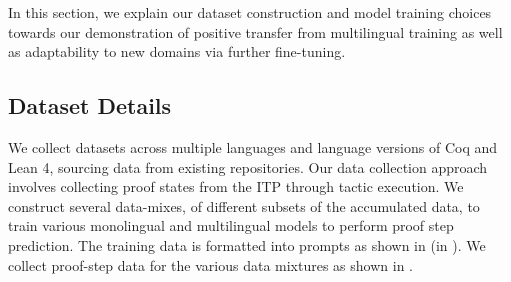 \newcommand{\CompCertUrl}[0]{\href{https://github.com/AbsInt/CompCert}{https://github.com/AbsInt/CompCert}}
\newcommand{\MathCompUrl}[0]{\href{https://github.com/math-comp/math-comp}{https://github.com/math-comp/math-comp}}
\newcommand{\GeoCoqUrl}[0]{\href{https://github.com/GeoCoq/GeoCoq}{https://github.com/GeoCoq/GeoCoq}}
\newcommand{\CategoryTheoryUrl}[0]{\href{https://github.com/jwiegley/category-theory}{https://github.com/jwiegley/category-theory}}
\newcommand{\LeanUrl}[0]{\href{https://github.com/leanprover-community/mathlib4}{https://github.com/leanprover-community/mathlib4}}
\newcommand{\CodeTFiveModelSize}[0]{\texttt{60 M}}
\newcommand{\CatTheory}[0]{\textsc{Cat-Theory}}

In this section, we explain our dataset construction and model training choices towards our demonstration of positive transfer from multilingual training as well as adaptability to new domains via further fine-tuning.

\subsection{Dataset Details}
We collect datasets across multiple languages and language versions of Coq and Lean 4, sourcing data from existing repositories. Our data collection approach involves collecting proof states from the ITP through tactic execution. We construct several data-mixes, of different subsets of the accumulated data, to train various monolingual and multilingual \proofwala{} models to perform proof step prediction. The training data is formatted into prompts as shown in  (in ). We collect proof-step data for the various data mixtures as shown in . 

